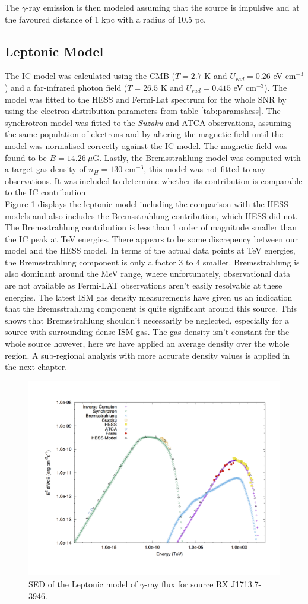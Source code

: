 \documentclass[12pt,a4paper]{article}
\begin{document}
The $\gamma$-ray emission is then modeled assuming that the source is impulsive and at the favoured distance of 1 kpc with a radius of 10.5 pc.


\subsection{Leptonic Model}
The IC model was calculated using the CMB ($T = 2.7$ K and $U_{rad} = 0.26$ eV cm$^{-3}$) and a far-infrared photon field ($T = 26.5$ K and $U_{rad} = 0.415$ eV cm$^{-3}$). The model was fitted to the HESS and Fermi-Lat spectrum for the whole SNR by using the electron distribution parameters from table \ref{tab:paramshess}. The synchrotron model was fitted to the \textit{Suzaku} and ATCA observations, assuming the same population of electrons and by altering the magnetic field until the model was normalised correctly against the IC model. The magnetic field was found to be $B = 14.26 \ \mu$G. Lastly, the Bremsstrahlung model was computed with a target gas density of $n_H = 130$ cm$^{-3}$, this model was not fitted to any observations. It was included to determine whether its contribution is comparable to the IC contribution\\

Figure \ref{fig:rxj1713lep} displays the leptonic model including the comparison with the HESS models and also includes the Bremsstrahlung contribution, which HESS did not. The Bremsstrahlung contribution is less than 1 order of magnitude smaller than the IC peak at TeV energies. There appears to be some discrepency between our model and the HESS model. In terms of the actual data points at TeV energies, the Bremsstrahlung component is only a factor 3 to 4 smaller. Bremsstrahlung is also dominant around the MeV range, where unfortunately, observational data are not available as Fermi-LAT observations aren't easily resolvable at these energies. The latest ISM gas density measurements have given us an indication that the Bremsstrahlung component is quite significant around this source. This shows that Bremsstrahlung shouldn't necessarily be neglected, especially for a source with surrounding dense ISM gas. The gas density isn't constant for the whole source however, here we have applied an average density over the whole region. A sub-regional analysis with more accurate density values is applied in the next chapter. 
\begin{figure}[H]
	\centering
	\includegraphics[width=0.45\linewidth, height=0.35\textheight, angle=-90]{rxj1713_lep}
	\caption{SED of the Leptonic model of $\gamma$-ray flux for source RX J1713.7-3946.}
	\label{fig:rxj1713lep}
\end{figure}
\end{document}
